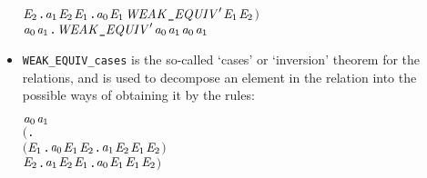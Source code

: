 \begin{itemize}
\begin{alltt}
        \HOLSymConst{\HOLTokenForall{}}\ensuremath{\HOLBoundVar{E}\sb{\mathrm{2}}}. \ensuremath{\HOLBoundVar{a}\sb{\mathrm{1}}} \HOLTokenTransBegin\HOLSymConst{\ensuremath{\tau}}\HOLTokenTransEnd \ensuremath{\HOLBoundVar{E}\sb{\mathrm{2}}} \HOLSymConst{\HOLTokenImp{}} \HOLSymConst{\HOLTokenExists{}}\ensuremath{\HOLBoundVar{E}\sb{\mathrm{1}}}. \ensuremath{\HOLBoundVar{a}\sb{\mathrm{0}}} \HOLSymConst{\HOLTokenEPS} \ensuremath{\HOLBoundVar{E}\sb{\mathrm{1}}} \HOLSymConst{\HOLTokenConj{}} \ensuremath{\HOLFreeVar{WEAK\HOLTokenUnderscore{}EQUIV}\sp{\prime}} \ensuremath{\HOLBoundVar{E}\sb{\mathrm{1}}} \ensuremath{\HOLBoundVar{E}\sb{\mathrm{2}}}\ensuremath{)} \HOLSymConst{\HOLTokenImp{}}
   \HOLSymConst{\HOLTokenForall{}}\ensuremath{\HOLBoundVar{a}\sb{\mathrm{0}}} \ensuremath{\HOLBoundVar{a}\sb{\mathrm{1}}}. \ensuremath{\HOLFreeVar{WEAK\HOLTokenUnderscore{}EQUIV}\sp{\prime}} \ensuremath{\HOLBoundVar{a}\sb{\mathrm{0}}} \ensuremath{\HOLBoundVar{a}\sb{\mathrm{1}}} \HOLSymConst{\HOLTokenImp{}} \ensuremath{\HOLBoundVar{a}\sb{\mathrm{0}}} \HOLSymConst{\HOLTokenWeakEQ} \ensuremath{\HOLBoundVar{a}\sb{\mathrm{1}}}
\end{alltt}
\item \texttt{WEAK_EQUIV_cases} is the so-called `cases' or `inversion' theorem for
  the relations, and is used to decompose an element in the relation into the possible ways of
  obtaining it by the rules:
\begin{alltt}
\HOLTokenTurnstile{} \ensuremath{\HOLFreeVar{a}\sb{\mathrm{0}}} \HOLSymConst{\HOLTokenWeakEQ} \ensuremath{\HOLFreeVar{a}\sb{\mathrm{1}}} \HOLSymConst{\HOLTokenEquiv{}}
   \ensuremath{(}\HOLSymConst{\HOLTokenForall{}}.
        \ensuremath{(}\HOLSymConst{\HOLTokenForall{}}\ensuremath{\HOLBoundVar{E}\sb{\mathrm{1}}}. \ensuremath{\HOLFreeVar{a}\sb{\mathrm{0}}} \HOLTokenTransBegin{} \HOLTokenTransEnd \ensuremath{\HOLBoundVar{E}\sb{\mathrm{1}}} \HOLSymConst{\HOLTokenImp{}} \HOLSymConst{\HOLTokenExists{}}\ensuremath{\HOLBoundVar{E}\sb{\mathrm{2}}}. \ensuremath{\HOLFreeVar{a}\sb{\mathrm{1}}} \HOLTokenWeakTransBegin{} \HOLTokenWeakTransEnd \ensuremath{\HOLBoundVar{E}\sb{\mathrm{2}}} \HOLSymConst{\HOLTokenConj{}} \ensuremath{\HOLBoundVar{E}\sb{\mathrm{1}}} \HOLSymConst{\HOLTokenWeakEQ} \ensuremath{\HOLBoundVar{E}\sb{\mathrm{2}}}\ensuremath{)} \HOLSymConst{\HOLTokenConj{}}
        \HOLSymConst{\HOLTokenForall{}}\ensuremath{\HOLBoundVar{E}\sb{\mathrm{2}}}. \ensuremath{\HOLFreeVar{a}\sb{\mathrm{1}}} \HOLTokenTransBegin{} \HOLTokenTransEnd \ensuremath{\HOLBoundVar{E}\sb{\mathrm{2}}} \HOLSymConst{\HOLTokenImp{}} \HOLSymConst{\HOLTokenExists{}}\ensuremath{\HOLBoundVar{E}\sb{\mathrm{1}}}. \ensuremath{\HOLFreeVar{a}\sb{\mathrm{0}}} \HOLTokenWeakTransBegin{} \HOLTokenWeakTransEnd \ensuremath{\HOLBoundVar{E}\sb{\mathrm{1}}} \HOLSymConst{\HOLTokenConj{}} \ensuremath{\HOLBoundVar{E}\sb{\mathrm{1}}} \HOLSymConst{\HOLTokenWeakEQ} \ensuremath{\HOLBoundVar{E}\sb{\mathrm{2}}}\ensuremath{)} \HOLSymConst{\HOLTokenConj{}}

\end{alltt}
\end{itemize}
